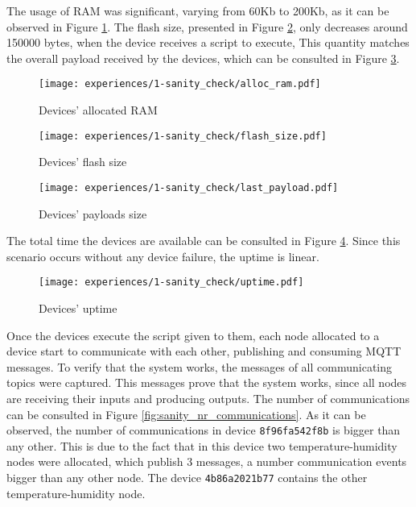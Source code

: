 The usage of RAM was significant, varying from 60Kb to 200Kb, as it can be observed in Figure \ref{fig:sanity_check_alloc_ram}. The flash size, presented in Figure \ref{fig:sanity_check_flash_size}, only decreases around 150000 bytes, when the device receives a script to execute, This quantity matches the overall payload received by the devices, which can be consulted in Figure \ref{fig:sanity_check_last_payload}.

\begin{figure}[h]
\centering
\texttt{[image: experiences/1-sanity\_check/alloc\_ram.pdf]}
\caption[Devices' allocated RAM]{Devices' allocated RAM}\label{fig:sanity_check_alloc_ram}
\end{figure}

\begin{figure}[H]
\centering
\texttt{[image: experiences/1-sanity\_check/flash\_size.pdf]}
\caption[Devices' flash size]{Devices' flash size}\label{fig:sanity_check_flash_size}
\end{figure}

\begin{figure}[h]
\centering
\texttt{[image: experiences/1-sanity\_check/last\_payload.pdf]}
\caption[Devices' payloads size]{Devices' payloads size}\label{fig:sanity_check_last_payload}
\end{figure}

The total time the devices are available can be consulted in Figure \ref{fig:sanity_check_uptime}. Since this scenario occurs without any device failure, the uptime is linear.

\begin{figure}[h]
\centering
\texttt{[image: experiences/1-sanity\_check/uptime.pdf]}
\caption[Devices' uptime]{Devices' uptime}\label{fig:sanity_check_uptime}
\end{figure}

Once the devices execute the script given to them, each node allocated to a device start to communicate with each other, publishing and consuming MQTT messages. To verify that the system works, the messages of all communicating topics were captured. This messages prove that the system works, since all nodes are receiving their inputs and producing outputs. The number of communications can be consulted in Figure \ref{fig:sanity_nr_communications}. As it can be observed, the number of communications in device \texttt{8f96fa542f8b} is bigger than any other. This is due to the fact that in this device two temperature-humidity nodes were allocated, which publish 3 messages, a number communication events bigger than any other node. The device \texttt{4b86a2021b77} contains the other temperature-humidity node.

